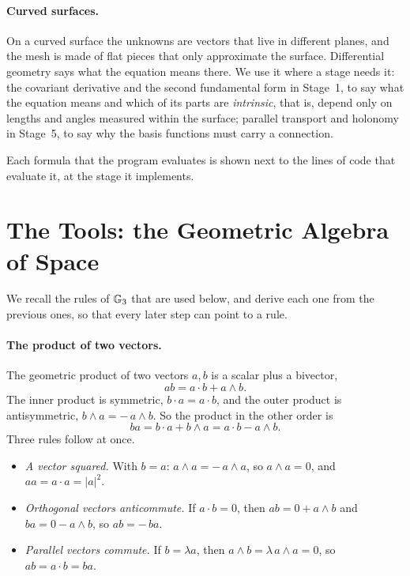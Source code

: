 \paragraph{Curved surfaces.} On a curved surface the unknowns are vectors that live in different planes, and the mesh is made of flat pieces that only approximate the surface. Differential geometry says what the equation means there. We use it where a stage needs it: the covariant derivative and the second fundamental form in Stage~1, to say what the equation means and which of its parts are \emph{intrinsic}, that is, depend only on lengths and angles measured within the surface; parallel transport and holonomy in Stage~5, to say why the basis functions must carry a connection.

Each formula that the program  evaluates is shown next to the lines of code that evaluate it, at the stage it implements.

\section{The Tools: the Geometric Algebra of Space}
\label{section:r2_tools}

We recall the rules of $\mathbb{G}_3$ that are used below, and derive each one from the previous ones, so that every later step can point to a rule.

\paragraph{The product of two vectors.} The geometric product of two vectors $a, b$ is a scalar plus a bivector,
\begin{equation*}
a b = a\cdot b + a\wedge b .
\end{equation*}
The inner product is symmetric, $b\cdot a = a\cdot b$, and the outer product is antisymmetric, $b\wedge a = -\,a\wedge b$. So the product in the other order is
\begin{equation*}
b a = b\cdot a + b\wedge a = a\cdot b - a\wedge b .
\end{equation*}
Three rules follow at once.
\begin{itemize}
\item \emph{A vector squared.} With $b = a$: $a\wedge a = -\,a\wedge a$, so $a\wedge a = 0$, and $aa = a\cdot a = |a|^2$.
\item \emph{Orthogonal vectors anticommute.} If $a\cdot b = 0$, then $ab = 0 + a\wedge b$ and $ba = 0 - a\wedge b$, so $ab = -\,ba$.
\item \emph{Parallel vectors commute.} If $b = \lambda a$, then $a\wedge b = \lambda\, a\wedge a = 0$, so $ab = a\cdot b = ba$.
\end{itemize}

